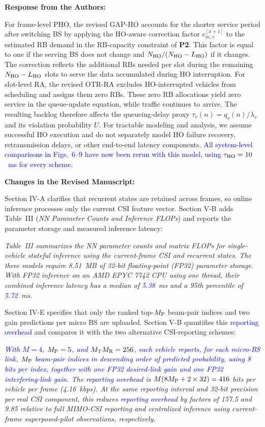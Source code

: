 \documentclass[11pt]{article}
\newenvironment{reviewedit}[1]
{\colorlet{responseblue}{#1}\colorlet{changeblue}{#1}\color{#1}}
{}
\newenvironment{authorresponse}
{\par\Needspace{3\baselineskip}\noindent\textcolor{responseblue}{\textbf{Response from the Authors:}}\par\nobreak\color{responseblue}}
{\par}
\newenvironment{manuscriptchanges}
{\par\noindent\textcolor{changeblue}{\textbf{Changes in the Revised Manuscript:}}\par\color{changeblue}}
{\par}
\begin{document}
\begin{reviewedit}{blue}
\begin{authorresponse}
For frame-level PHO, the revised GAP-HO accounts for the shorter service period after
switching BS by applying the HO-aware correction factor $c_{m,v}^{[x+1]}$ to the estimated RB demand in the
RB-capacity constraint of \textbf{P2}. This factor is equal to one if the serving BS
does not change and $N_{\rm HO}/(N_{\rm HO}-L_{\rm HO})$ if it changes.
The correction reflects the additional RBs needed per slot during the
remaining $N_{\rm HO}-L_{\rm HO}$ slots to serve the data accumulated during HO
interruption. For slot-level RA, the revised OTR-RA excludes HO-interrupted vehicles from
scheduling and assigns them zero RBs. 
These zero RB allocations yield zero service in the queue-update equation,
while traffic continues to arrive. The resulting backlog therefore affects
the queueing-delay proxy $\tau_v(n)=q_v(n)/\lambda_v$ and its violation
probability $U$. 
For tractable modeling and analysis, we assume successful HO execution and
do not separately model HO failure recovery, retransmission delays, or other
end-to-end latency components.
\textcolor{blue}{All system-level comparisons in Figs.~\textcolor{blue}{6--9} have now been
rerun with this model, using $\tau_{\rm HO}=10$~ms for every scheme.}
\end{authorresponse}
\begin{manuscriptchanges}
Section IV-A clarifies that recurrent states are retained across frames,
so online inference processes only the current CSI feature vector.
Section V-B adds Table~III (\emph{NN Parameter Counts and Inference FLOPs})
and reports the parameter storage and measured inference latency:

\emph{Table~III summarizes the NN parameter counts and matrix FLOPs for single-vehicle stateful inference using the current-frame CSI and recurrent states. The three models require 8.51~MB of 32-bit floating-point (FP32) parameter storage. With FP32 inference on an AMD EPYC 7742 CPU using one thread, their combined inference latency has a median of \textcolor{blue}{5.38}~ms and a 95th percentile of \textcolor{blue}{5.72}~ms.}

Section IV-E specifies that only the ranked top-$M_{\rm P}$ beam-pair indices
and two gain predictions per micro BS are uploaded. Section V-B quantifies
this \textcolor{blue}{reporting overhead} and compares it with the two alternative CSI-reporting schemes:

\emph{\textcolor{blue}{With $M=4$, $M_{\rm P}=5$, and $M_{\rm T}M_{\rm R}=256$, each vehicle reports, for each micro-BS link, $M_{\rm P}$ beam-pair indices in descending order of predicted probability, using 8 bits per index, together with one FP32 desired-link gain and one FP32 interfering-link gain.} The \textcolor{blue}{reporting overhead} is $M(8M_{\rm P}+2\times32)=416$ bits per vehicle per frame (4.16~kbps). At the same reporting interval and 32-bit precision per real CSI component, this reduces \textcolor{blue}{reporting overhead} by factors of 157.5 and 9.85 relative to full MIMO-CSI reporting and centralized inference using current-frame superposed-pilot observations, respectively.}


\end{manuscriptchanges}
\end{reviewedit}
\end{document}
